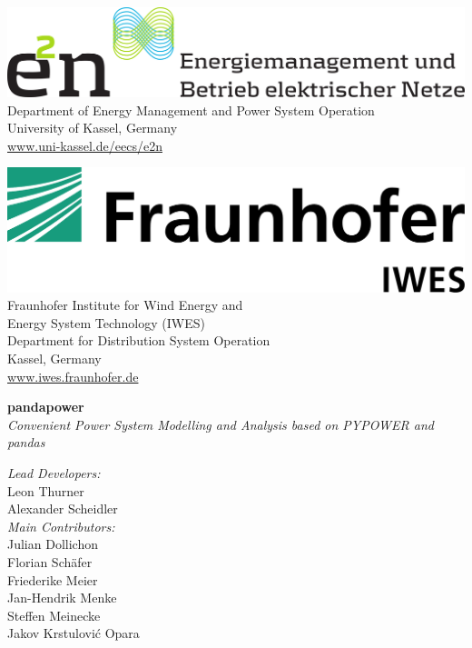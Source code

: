 \begin{titlepage}
\vspace*{1cm} 

\center
\begin{minipage}[t]{0.45\textwidth}
\includegraphics[width=1\textwidth]{../report/e2n.png}\\[1.5em]
Department of Energy Management and Power System Operation \\[0.5em]
University of Kassel, Germany \\[0.5em]
\href{url}{www.uni-kassel.de/eecs/e2n}
\end{minipage}\hfill
\begin{minipage}[t]{0.45\textwidth}
\includegraphics[width=.75\textwidth]{../report/IWES.png} \\[1em]
Fraunhofer Institute for Wind Energy and \\ Energy System Technology (IWES) \\[0.5em]
Department for Distribution System Operation \\[0.5em]
Kassel, Germany \\[0.5em]
\href{url}{www.iwes.fraunhofer.de}
\end{minipage}



\vfill
\large
\flushleft
\begin{minipage}{0.5\textwidth}
\textbf{pandapower}\\[0.5em]
\textit{Convenient Power System Modelling and Analysis based on PYPOWER and pandas}\\[2em]
\end{minipage}

\textit{Lead Developers:}\\
Leon Thurner \\
Alexander Scheidler\\[1em]

\textit{Main Contributors:} \\
Julian Dollichon     \\
Florian Schäfer      \\
Friederike Meier     \\
Jan-Hendrik Menke    \\
Steffen Meinecke  \\
Jakov Krstulović Opara\\[1em]


\end{titlepage}
